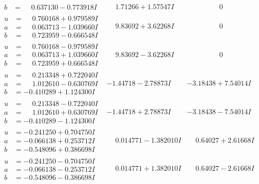 \documentclass[1p]{elsarticle_modified}
\theoremstyle{definition}
\begin{document}
$$\begin{array}{c|c|c}
\begin{aligned}
b &= \phantom{-}0.637130 - 0.773918 I\end{aligned}
 & \phantom{-}1.71266 + 1.57547 I & \phantom{-0.000000 } 0 \\ \hline\begin{aligned}
u &= \phantom{-}0.760168 + 0.979589 I \\
a &= \phantom{-}0.063713 - 1.039660 I \\
b &= \phantom{-}0.723959 - 0.666548 I\end{aligned}
 & \phantom{-}9.83692 + 3.62268 I & \phantom{-0.000000 } 0 \\ \hline\begin{aligned}
u &= \phantom{-}0.760168 - 0.979589 I \\
a &= \phantom{-}0.063713 + 1.039660 I \\
b &= \phantom{-}0.723959 + 0.666548 I\end{aligned}
 & \phantom{-}9.83692 - 3.62268 I & \phantom{-0.000000 } 0 \\ \hline\begin{aligned}
u &= \phantom{-}0.213348 + 0.722040 I \\
a &= \phantom{-}1.012610 - 0.630769 I \\
b &= -0.410289 + 1.124300 I\end{aligned}
 & -1.44718 - 2.78873 I & -3.18438 + 7.54014 I \\ \hline\begin{aligned}
u &= \phantom{-}0.213348 - 0.722040 I \\
a &= \phantom{-}1.012610 + 0.630769 I \\
b &= -0.410289 - 1.124300 I\end{aligned}
 & -1.44718 + 2.78873 I & -3.18438 - 7.54014 I \\ \hline\begin{aligned}
u &= -0.241250 + 0.704750 I \\
a &= -0.066138 + 0.253712 I \\
b &= -0.548096 + 0.386698 I\end{aligned}
 & \phantom{-}0.014771 - 1.382010 I & \phantom{-}0.64027 + 2.61668 I \\ \hline\begin{aligned}
u &= -0.241250 - 0.704750 I \\
a &= -0.066138 - 0.253712 I \\
b &= -0.548096 - 0.386698 I\end{aligned}
 & \phantom{-}0.014771 + 1.382010 I & \phantom{-}0.64027 - 2.61668 I \\ \hline\begin{aligned}

\end{aligned}
\end{array}$$
\end{document}

